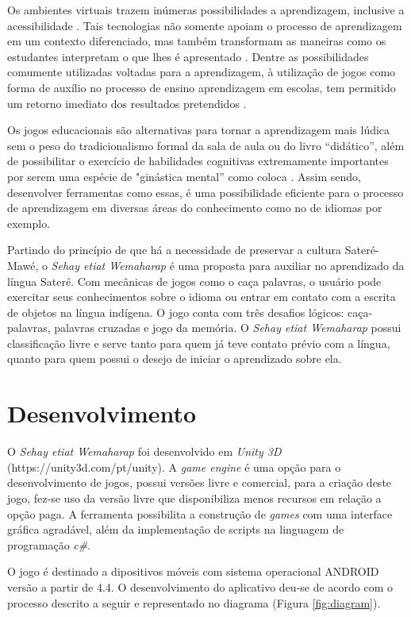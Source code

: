 \documentclass[12pt]{article}
\begin{document}
		Os ambientes virtuais trazem inúmeras possibilidades a aprendizagem, inclusive a acessibilidade \cite{kozma2003}. Tais tecnologias não somente apoiam o processo de aprendizagem em um contexto diferenciado, mas também transformam as maneiras como os estudantes interpretam o que lhes é apresentado \cite{saljo2010digital}.  Dentre as possibilidades comumente utilizadas voltadas para a aprendizagem, à utilização de jogos como forma de auxílio no processo de ensino aprendizagem em escolas, tem permitido um retorno imediato dos resultados pretendidos \cite{yamato2017amargana}. 
		
		Os jogos educacionais são alternativas para tornar a aprendizagem mais lúdica sem o peso do tradicionalismo formal da sala de aula ou do livro “didático”, além de possibilitar o exercício de habilidades cognitivas extremamente importantes por serem uma espécie de "ginástica mental” como coloca \cite{tarouco2004jogos}. Assim sendo, desenvolver ferramentas como essas, é uma possibilidade eficiente para o processo de aprendizagem em diversas áreas do conhecimento como no de idiomas por exemplo.
		
		Partindo do princípio de que há a necessidade de preservar a cultura Sateré-Mawé, o \textit{Sehay etiat Wemaharap} é uma proposta para auxiliar no aprendizado da língua Sateré. Com mecânicas de jogos como o caça palavras, o usuário pode exercitar seus conhecimentos sobre o idioma ou entrar em contato com a escrita de objetos na língua indígena. O jogo conta com três desafios lógicos: caça-palavras, palavras cruzadas e jogo da memória. O \textit{Sehay etiat Wemaharap} possui classificação livre e serve tanto para quem já teve contato prévio com a língua, quanto para quem possui o desejo de iniciar o aprendizado sobre ela.

	\section{Desenvolvimento} \label{sec:firstpage}
		O \textit{Sehay etiat Wemaharap} foi desenvolvido em \textit{Unity 3D} (https://unity3d.com/pt/unity). A \textit{game engine} é uma opção para o desenvolvimento de jogos, possui versões livre e comercial, para a criação deste jogo, fez-se uso da versão livre que disponibiliza menos recursos em relação a opção paga. A ferramenta possibilita a construção de \textit{games} com uma interface gráfica agradável, além da implementação de scripts na linguagem de programação \textit{c\#}.
		
		O jogo é destinado a dipositivos móveis com sistema operacional ANDROID versão a partir de 4.4. O desenvolvimento do aplicativo deu-se de acordo com o processo descrito a seguir e representado no diagrama (Figura \ref{fig:diagram}).
		
\end{document}
